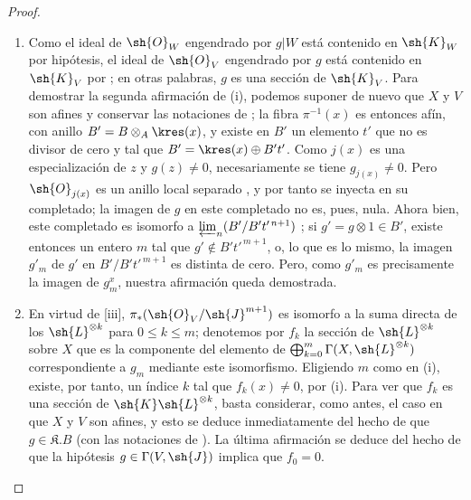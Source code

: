 \documentclass[oneside,10pt]{amsart}
\renewcommand{\leq}{\leqslant}
\begin{document}
\begin{proof}
\begin{enumerate}
    \item[\rm{(i)}] Como el ideal de $\sh{O}_W$ engendrado por $g|W$ está contenido en $\sh{K}_W$ por hipótesis, el ideal de $\sh{O}_V$ engendrado por $g$ está contenido en $\sh{K}_V$ por ; en otras palabras, $g$ es una sección de $\sh{K}_V$.
        Para demostrar la segunda afirmación de (i), podemos suponer de nuevo que $X$ y $V$ son afines y conservar las notaciones de ;
        la fibra $\pi^{-1}(x)$ es entonces afín, con anillo $B'=B\otimes_A\kres(x)$, y existe en $B'$ un elemento $t'$ que no es divisor de cero y tal que $B'=\kres(x)\oplus B't'$.
        Como $j(x)$ es una especialización de $z$ y $g(z)\neq0$, necesariamente se tiene $g_{j(x)}\neq0$.
        Pero $\sh{O}_{j(x)}$ es un anillo local separado , y por tanto se inyecta en su completado; la imagen de $g$ en este completado no es, pues, nula.
        Ahora bien, este completado es isomorfo a $\varprojlim_n(B'/B't'^{\,n+1})$ ;
        si $g'=g\otimes1\in B'$, existe entonces un entero $m$ tal que $g'\notin B't'^{\,m+1}$, o, lo que es lo mismo, la imagen $g'_m$ de $g'$ en $B'/B't'^{\,m+1}$ es distinta de cero.
        Pero, como $g'_m$ es precisamente la imagen de $g_m^x$, nuestra afirmación queda demostrada.
    \item[\rm{(ii)}] En virtud de [iii], $\pi_*(\sh{O}_V/\sh{J}^{m+1})$ es isomorfo a la suma directa de los $\sh{L}^{\otimes k}$ para $0\leq k\leq m$;
        denotemos por $f_k$ la sección de $\sh{L}^{\otimes k}$ sobre $X$ que es la componente del elemento de $\bigoplus_{k=0}^m\Gamma(X,\sh{L}^{\otimes k})$ correspondiente a $g_m$ mediante este isomorfismo.
        Eligiendo $m$ como en (i), existe, por tanto, un índice $k$ tal que $f_k(x)\neq0$, por (i).
        Para ver que $f_k$ es una sección de $\sh{K}\sh{L}^{\otimes k}$, basta considerar, como antes, el caso en que $X$ y $V$ son afines, y esto se deduce inmediatamente del hecho de que $g\in\mathfrak{K}.B$ (con las notaciones de ).
        La última afirmación se deduce del hecho de que la hipótesis $g\in\Gamma(V,\sh{J})$ implica que $f_0=0$.
\end{enumerate}
\end{proof}
\end{document}

